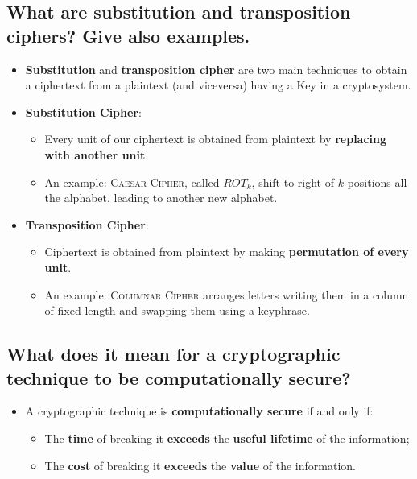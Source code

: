 \documentclass[9pt, letterpaper]{article}
\begin{document}
\subsection{What are substitution and transposition ciphers? Give also examples.}
\begin{itemize}
	\item \textbf{Substitution} and \textbf{transposition cipher} are two main techniques to obtain a ciphertext from a plaintext (and viceversa) having a Key in a cryptosystem.
	\item \textbf{Substitution Cipher}: 
	\begin{itemize}
	\item Every unit of our ciphertext is obtained from plaintext by \textbf{replacing with another unit}.
	\item An example: \textsc{Caesar Cipher}, called $ROT_k$, shift to right of $k$ positions all the alphabet, leading to another new alphabet.
	\end{itemize}
	 
	\item \textbf{Transposition Cipher}: 
	\begin{itemize}
		\item Ciphertext is obtained from plaintext by making \textbf{permutation of every unit}.
		\item An example: \textsc{Columnar Cipher} arranges letters writing them in a column of fixed length and swapping them using a keyphrase.
	
	\end{itemize}	 
\end{itemize}

\subsection{What does it mean for a cryptographic technique to be computationally secure?}
\begin{itemize}
	\item A cryptographic technique is \textbf{computationally secure} if and only if:
	\begin{itemize}
		\item The \textbf{time} of breaking it \textbf{exceeds} the \textbf{useful lifetime} of the information;
		\item The \textbf{cost} of breaking it \textbf{exceeds} the \textbf{value} of the information.
	\end{itemize}
\end{itemize}
\end{document}

